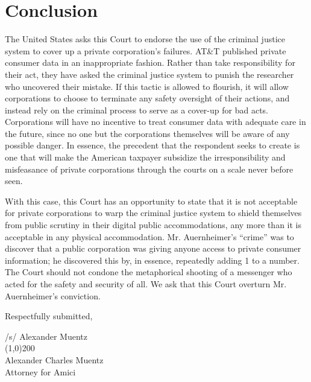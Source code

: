 \documentclass{article}
\begin{document}
	\section{Conclusion}
	
	The United States asks this Court to endorse the use of the criminal justice system to cover up a private corporation's failures. AT\&T published private consumer data in an inappropriate fashion. Rather than take responsibility for their act, they have asked the criminal justice system to punish the researcher who uncovered their mistake. If this tactic is allowed to flourish, it will allow corporations to choose to terminate any safety oversight of their actions, and instead rely on the criminal process to serve as a cover-up for bad acts. Corporations will have no incentive to treat consumer data with adequate care in the future, since no one but the corporations themselves will be aware of any possible danger. In essence, the precedent that the respondent seeks to create is one that will make the American taxpayer subsidize the irresponsibility and misfeasance of private corporations through the courts on a scale never before seen.
	
	With this case, this Court has an opportunity to state that it is not acceptable for private corporations to warp the criminal justice system to shield themselves from public scrutiny in their digital public accommodations, any more than it is acceptable in any physical accommodation. Mr. Auernheimer's ``crime'' was to discover that a public corporation was giving anyone access to private consumer information; he discovered this by, in essence, repeatedly adding 1 to a number. The Court should not condone the metaphorical shooting of a messenger who acted for the safety and security of all. We ask that this Court overturn Mr. Auernheimer's conviction.
	
	\vspace{0.3in}
	
	\noindent Respectfully submitted,
	
	\vspace{0.2in}
	
	
	\noindent/s/ Alexander Muentz\\
	\noindent \line(1,0){200}	\\
	Alexander Charles Muentz \\
	Attorney for Amici
    
\end{document}
